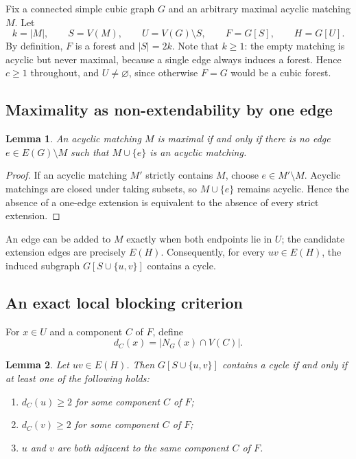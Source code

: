 \documentclass[smallextended,natbib,nospthms]{svjour3}
\newtheorem{lemma}[lemma]{Lemma}
\theoremstyle{definition}
\theoremstyle{remark}
\begin{document}
Fix a connected simple cubic graph $G$ and an arbitrary maximal acyclic
matching $M$. Let
\[
  k=|M|,\qquad S=V(M),\qquad U=V(G)\setminus S,\qquad
  F=G[S],\qquad H=G[U].
\]
By definition, $F$ is a forest and $|S|=2k$. Note that $k\geq 1$: the empty
matching is acyclic but never maximal, because a single edge always induces a
forest. Hence $c\geq 1$ throughout, and $U\neq\varnothing$, since otherwise
$F=G$ would be a cubic forest.

\subsection{Maximality as non-extendability by one edge}

\begin{lemma}
\label{lem:one-edge}
An acyclic matching $M$ is maximal if and only if there is no edge
$e\in E(G)\setminus M$ such that $M\cup\{e\}$ is an acyclic matching.
\end{lemma}

\begin{proof}
If an acyclic matching $M'$ strictly contains $M$, choose
$e\in M'\setminus M$. Acyclic matchings are closed under taking subsets, so
$M\cup\{e\}$ remains acyclic. Hence the absence of a one-edge extension is
equivalent to the absence of every strict extension.
\end{proof}

An edge can be added to $M$ exactly when both endpoints lie in $U$; the
candidate extension edges are precisely $E(H)$. Consequently, for every
$uv\in E(H)$, the induced subgraph $G[S\cup\{u,v\}]$ contains a cycle.

\subsection{An exact local blocking criterion}

For $x\in U$ and a component $C$ of $F$, define
\[
  d_C(x)=|N_G(x)\cap V(C)|.
\]

\begin{lemma}
\label{lem:blocking}
Let $uv\in E(H)$. Then $G[S\cup\{u,v\}]$ contains a cycle if and only if at
least one of the following holds:
\begin{enumerate}[label=(\roman*),leftmargin=2em]
  \item $d_C(u)\geq 2$ for some component $C$ of $F$;
  \item $d_C(v)\geq 2$ for some component $C$ of $F$;
  \item $u$ and $v$ are both adjacent to the same component $C$ of $F$.
\end{enumerate}
\end{lemma}
\end{document}
